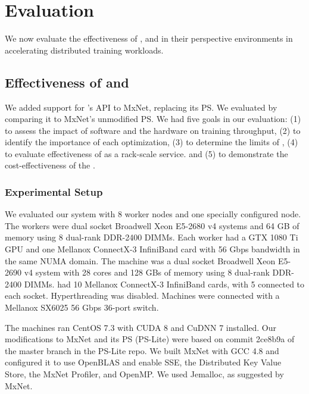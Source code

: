 \chapter {Evaluation}
We now evaluate the effectiveness of \pbox, \phub and \plink in their perspective environments in accelerating distributed training workloads.

\section{Effectiveness of \phub and \pbox}
We added support for \phub{}'s API to MxNet, replacing its PS. We evaluated \phub by comparing it to MxNet's unmodified PS. We had five goals in our evaluation: (1) to assess the impact of \phub software and the \pbox hardware on training throughput, (2) to identify the importance of each optimization, (3) to determine the limits of \pbox, (4) to evaluate effectiveness of \pbox as a rack-scale service. and (5) to demonstrate the cost-effectiveness of the \phub.


\subsection{Experimental Setup}
We evaluated our system with 8 worker nodes and one specially configured \pbox node. The workers were dual socket Broadwell Xeon E5-2680 v4 systems 
and 64 GB of memory using 8 dual-rank DDR-2400 DIMMs. Each worker had a GTX 1080 Ti GPU %
and one Mellanox ConnectX-3 InfiniBand card with 56 Gbps bandwidth in the same NUMA domain. The \pbox machine was a dual socket Broadwell Xeon E5-2690 v4 system with 28 cores %
and 128 GBs of memory using 8 dual-rank DDR-2400 DIMMs. \pbox had 10 Mellanox ConnectX-3 InfiniBand cards, with 5 connected to each socket. Hyperthreading was disabled. Machines were connected with a Mellanox SX6025 56 Gbps 36-port switch.

The machines ran CentOS 7.3 with CUDA 8 and CuDNN 7 installed. Our modifications to MxNet and its PS (PS-Lite) were based on commit 2ce8b9a of the master branch in the PS-Lite repo. We built MxNet with GCC 4.8 and configured it to use OpenBLAS and enable SSE, the Distributed Key Value Store, the MxNet Profiler, and OpenMP. We used Jemalloc, as suggested by MxNet.

